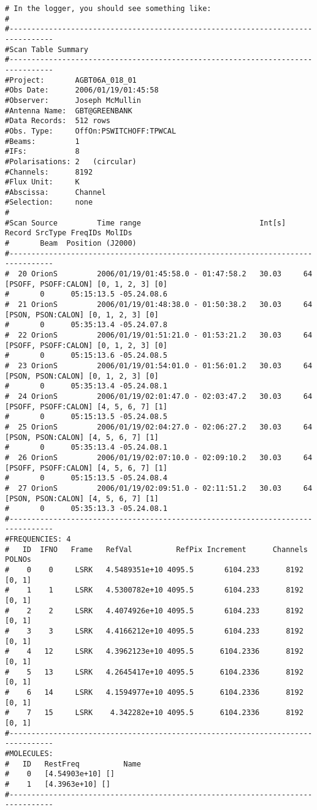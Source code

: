 \begin{verbatim}
# In the logger, you should see something like:
#
#--------------------------------------------------------------------------------
#Scan Table Summary
#--------------------------------------------------------------------------------
#Project:       AGBT06A_018_01
#Obs Date:      2006/01/19/01:45:58
#Observer:      Joseph McMullin
#Antenna Name:  GBT@GREENBANK
#Data Records:  512 rows
#Obs. Type:     OffOn:PSWITCHOFF:TPWCAL
#Beams:         1   
#IFs:           8   
#Polarisations: 2   (circular)
#Channels:      8192
#Flux Unit:     K
#Abscissa:      Channel
#Selection:     none
#
#Scan Source         Time range                           Int[s] Record SrcType FreqIDs MolIDs 
#       Beam  Position (J2000)       
#--------------------------------------------------------------------------------
#  20 OrionS         2006/01/19/01:45:58.0 - 01:47:58.2   30.03     64  [PSOFF, PSOFF:CALON] [0, 1, 2, 3] [0]
#       0      05:15:13.5 -05.24.08.6
#  21 OrionS         2006/01/19/01:48:38.0 - 01:50:38.2   30.03     64  [PSON, PSON:CALON] [0, 1, 2, 3] [0]
#       0      05:35:13.4 -05.24.07.8
#  22 OrionS         2006/01/19/01:51:21.0 - 01:53:21.2   30.03     64  [PSOFF, PSOFF:CALON] [0, 1, 2, 3] [0]
#       0      05:15:13.6 -05.24.08.5
#  23 OrionS         2006/01/19/01:54:01.0 - 01:56:01.2   30.03     64  [PSON, PSON:CALON] [0, 1, 2, 3] [0]
#       0      05:35:13.4 -05.24.08.1
#  24 OrionS         2006/01/19/02:01:47.0 - 02:03:47.2   30.03     64  [PSOFF, PSOFF:CALON] [4, 5, 6, 7] [1]
#       0      05:15:13.5 -05.24.08.5
#  25 OrionS         2006/01/19/02:04:27.0 - 02:06:27.2   30.03     64  [PSON, PSON:CALON] [4, 5, 6, 7] [1]
#       0      05:35:13.4 -05.24.08.1
#  26 OrionS         2006/01/19/02:07:10.0 - 02:09:10.2   30.03     64  [PSOFF, PSOFF:CALON] [4, 5, 6, 7] [1]
#       0      05:15:13.5 -05.24.08.4
#  27 OrionS         2006/01/19/02:09:51.0 - 02:11:51.2   30.03     64  [PSON, PSON:CALON] [4, 5, 6, 7] [1]
#       0      05:35:13.3 -05.24.08.1
#--------------------------------------------------------------------------------
#FREQUENCIES: 4
#   ID  IFNO   Frame   RefVal          RefPix Increment      Channels POLNOs
#    0    0     LSRK   4.5489351e+10 4095.5       6104.233      8192  [0, 1]
#    1    1     LSRK   4.5300782e+10 4095.5       6104.233      8192  [0, 1]
#    2    2     LSRK   4.4074926e+10 4095.5       6104.233      8192  [0, 1]
#    3    3     LSRK   4.4166212e+10 4095.5       6104.233      8192  [0, 1]
#    4   12     LSRK   4.3962123e+10 4095.5      6104.2336      8192  [0, 1]
#    5   13     LSRK   4.2645417e+10 4095.5      6104.2336      8192  [0, 1]
#    6   14     LSRK   4.1594977e+10 4095.5      6104.2336      8192  [0, 1]
#    7   15     LSRK    4.342282e+10 4095.5      6104.2336      8192  [0, 1]
#--------------------------------------------------------------------------------
#MOLECULES: 
#   ID   RestFreq          Name           
#    0   [4.54903e+10] []
#    1   [4.3963e+10] []
#--------------------------------------------------------------------------------


\end{verbatim}

